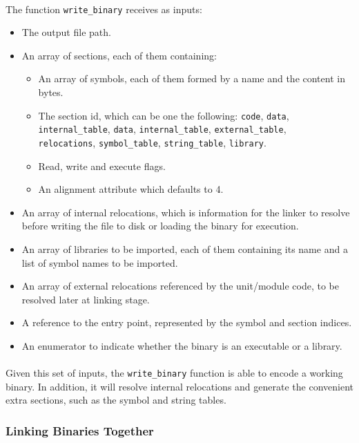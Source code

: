 \documentclass[12pt]{article}
\begin{document}
	\paragraph{}
	The function \verb|write_binary| receives as inputs:
	\begin{itemize}
		\item The output file path.
		\item An array of sections, each of them containing:
		\begin{itemize}
			\item An array of symbols, each of them formed by a name and the content in bytes.
			\item The section id, which can be one the following: \verb|code|, \verb|data|, \verb|internal_table|, \verb|data|, \verb|internal_table|, \verb|external_table|,\\ \verb|relocations|, \verb|symbol_table|, \verb|string_table|, \verb|library|.
			\item Read, write and execute flags.
			\item An alignment attribute which defaults to 4.
		\end{itemize}
		\item An array of internal relocations, which is information for the linker to resolve before writing the file to disk or loading the binary for execution.
		\item An array of libraries to be imported, each of them containing its name and a list of symbol names to be imported.
		\item An array of external relocations referenced by the unit/module code, to be resolved later at linking stage.
		\item A reference to the entry point, represented by the symbol and section indices.
		\item An enumerator to indicate whether the binary is an executable or a library.
	\end{itemize}
	\paragraph{}Given this set of inputs, the \verb|write_binary| function is able to encode a working binary. In addition, it will resolve internal relocations and generate the convenient extra sections, such as the symbol and string tables.
	
	\subsubsection{Linking Binaries Together}
\end{document}
